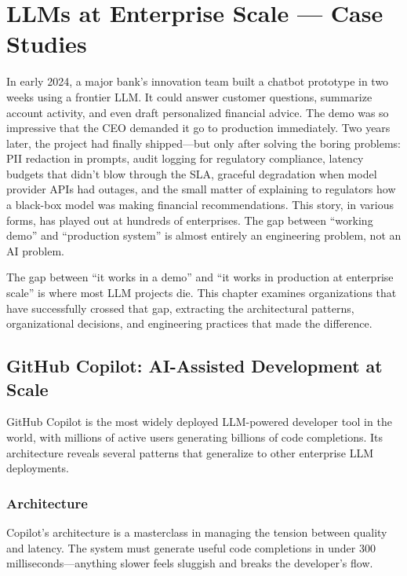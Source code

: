 \chapter{LLMs at Enterprise Scale --- Case Studies}
\label{ch:enterprise}

\noindent
In early 2024, a major bank's innovation team built a chatbot prototype in two weeks using a frontier LLM. It could answer customer questions, summarize account activity, and even draft personalized financial advice. The demo was so impressive that the CEO demanded it go to production immediately. Two years later, the project had finally shipped---but only after solving the boring problems: PII redaction in prompts, audit logging for regulatory compliance, latency budgets that didn't blow through the SLA, graceful degradation when model provider APIs had outages, and the small matter of explaining to regulators how a black-box model was making financial recommendations. This story, in various forms, has played out at hundreds of enterprises. The gap between ``working demo'' and ``production system'' is almost entirely an engineering problem, not an AI problem.

The gap between ``it works in a demo'' and ``it works in production at enterprise scale'' is where most LLM projects die. This chapter examines organizations that have successfully crossed that gap, extracting the architectural patterns, organizational decisions, and engineering practices that made the difference.

\section{GitHub Copilot: AI-Assisted Development at Scale}
\label{sec:copilot}

GitHub Copilot is the most widely deployed LLM-powered developer tool in the world, with millions of active users generating billions of code completions. Its architecture reveals several patterns that generalize to other enterprise LLM deployments.

\subsection{Architecture}

Copilot's architecture is a masterclass in managing the tension between quality and latency. The system must generate useful code completions in under 300 milliseconds---anything slower feels sluggish and breaks the developer's flow.

